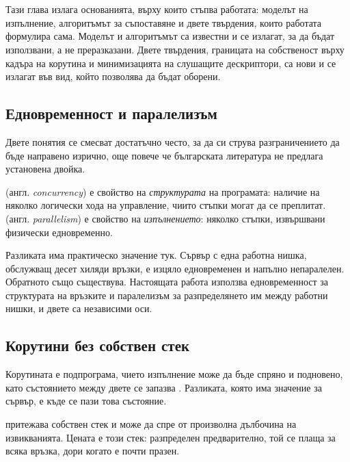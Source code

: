 \section{}

Тази глава излага основанията, върху които стъпва работата: моделът на изпълнение,
алгоритъмът за съпоставяне и двете твърдения, които работата формулира сама. Моделът и
алгоритъмът са известни и се излагат, за да бъдат използвани, а не преразказани. Двете
твърдения, границата на собственост върху кадъра на корутина и минимизацията на слушащите
дескриптори, са нови и се излагат във вид, който позволява да бъдат оборени.

\subsection{Едновременност и паралелизъм}

Двете понятия се смесват достатъчно често, за да си струва разграничението да бъде направено
изрично, още повече че българската литература не предлага установена двойка.

 (англ. \emph{concurrency}) е свойство на \emph{структурата} на
програмата: наличие на няколко логически хода на управление, чиито стъпки могат да се
преплитат.  (англ. \emph{parallelism}) е свойство на \emph{изпълнението}:
няколко стъпки, извършвани физически едновременно.

Разликата има практическо значение тук. Сървър с една работна нишка, обслужващ десет хиляди
връзки, е изцяло едновременен и напълно непаралелен. Обратното също съществува. Настоящата
работа използва едновременност за структурата на връзките и паралелизъм за разпределянето им
между работни нишки, и двете са независими оси.

\subsection{Корутини без собствен стек}

Корутината е подпрограма, чието изпълнение може да бъде спряно и подновено, като състоянието
между двете се запазва \cite{baker2009coroutines}. Разликата, която има значение за сървър, е
къде се пази това състояние.

 притежава собствен стек и може да спре от произволна дълбочина на
извикванията. Цената е този стек: разпределен предварително, той се плаща за всяка връзка,
дори когато е почти празен.

